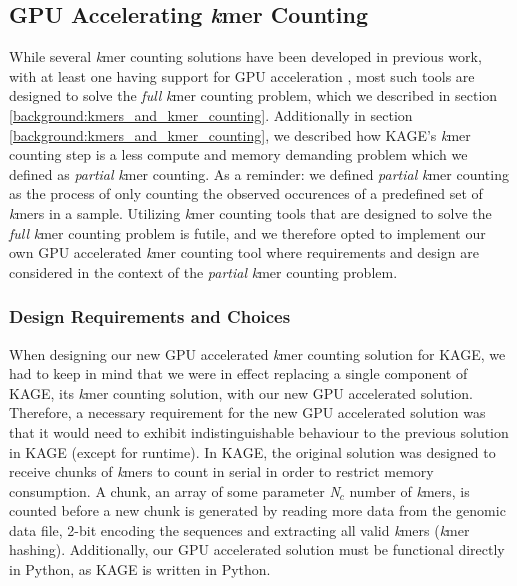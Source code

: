 \subsection{GPU Accelerating \textit{k}mer Counting}
While several \textit{k}mer counting solutions have been developed in previous work, with at least one having support for GPU acceleration \cite{kmer_counting_tools}, most such tools are designed to solve the \textit{full} \textit{k}mer counting problem, which we described in section \ref{background:kmers_and_kmer_counting}.
Additionally in section \ref{background:kmers_and_kmer_counting}, we described how KAGE's \textit{k}mer counting step is a less compute and memory demanding problem which we defined as \textit{partial} \textit{k}mer counting.
As a reminder: we defined \textit{partial} \textit{k}mer counting as the process of only counting the observed occurences of a predefined set of \textit{k}mers in a sample.
Utilizing \textit{k}mer counting tools that are designed to solve the \textit{full} \textit{k}mer counting problem is futile, and we therefore opted to implement our own GPU accelerated \textit{k}mer counting tool where requirements and design are considered in the context of the \textit{partial} \textit{k}mer counting problem.

\subsubsection{Design Requirements and Choices}
When designing our new GPU accelerated \textit{k}mer counting solution for KAGE, we had to keep in mind that we were in effect replacing a single component of KAGE, its \textit{k}mer counting solution, with our new GPU accelerated solution.
Therefore, a necessary requirement for the new GPU accelerated solution was that it would need to exhibit indistinguishable behaviour to the previous solution in KAGE (except for runtime).
In KAGE, the original solution was designed to receive chunks of \textit{k}mers to count in serial in order to restrict memory consumption.
A chunk, an array of some parameter \textit{N$_c$} number of \textit{k}mers, is counted before a new chunk is generated by reading more data from the genomic data file, 2-bit encoding the sequences and extracting all valid \textit{k}mers (\textit{k}mer hashing).
Additionally, our GPU accelerated solution must be functional directly in Python, as KAGE is written in Python.

